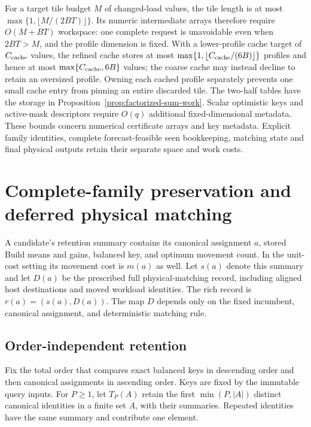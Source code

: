 \documentclass[11pt]{article}
\begin{document}
For a target tile budget $M$ of changed-load values, the tile length is at most $\max\{1,\lfloor M/(2BT)\rfloor\}$. Its numeric intermediate arrays therefore require $O(M+BT)$ workspace: one complete request is unavoidable even when $2BT>M$, and the profile dimension is fixed. With a lower-profile cache target of $C_{\rm cache}$ values, the refined cache stores at most $\max\{1,\lfloor C_{\rm cache}/(6B)\rfloor\}$ profiles and hence at most $\max\{C_{\rm cache},6B\}$ values; the coarse cache may instead decline to retain an oversized profile. Owning each cached profile separately prevents one small cache entry from pinning an entire discarded tile. The two-half tables have the storage in Proposition~\ref{prop:factorized-sum-work}. Scalar optimistic keys and active-mask descriptors require $O(q)$ additional fixed-dimensional metadata. These bounds concern numerical certificate arrays and key metadata. Explicit family identities, complete forecast-feasible seen bookkeeping, matching state and final physical outputs retain their separate space and work costs.

\section{Complete-family preservation and deferred physical matching}
\label{sec:family-preservation}
A candidate's retention summary contains its canonical assignment $a$, stored Build means and gains, balanced key, and optimum movement count. In the unit-cost setting its movement cost is $m(a)$ as well. Let $s(a)$ denote this summary and let $D(a)$ be the prescribed full physical-matching record, including aligned host destinations and moved workload identities. The rich record is $r(a)=(s(a),D(a))$. The map $D$ depends only on the fixed incumbent, canonical assignment, and deterministic matching rule.

\subsection{Order-independent retention}
Fix the total order that compares exact balanced keys in descending order and then canonical assignments in ascending order. Keys are fixed by the immutable query inputs. For $P\ge1$, let $T_P(A)$ retain the first $\min(P,|A|)$ distinct canonical identities in a finite set $A$, with their summaries. Repeated identities have the same summary and contribute one element.
\end{document}
